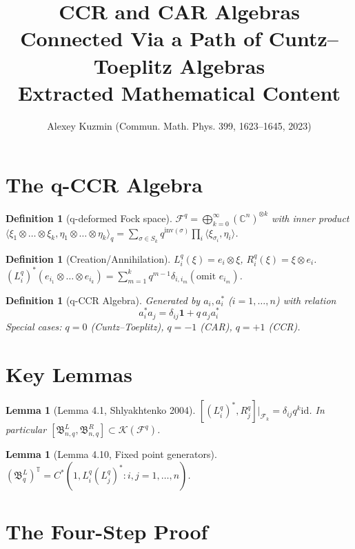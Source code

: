 \documentclass{article}
\title{CCR and CAR Algebras Connected Via a Path of Cuntz--Toeplitz Algebras\\
       \large Extracted Mathematical Content}
\author{Alexey Kuzmin (Commun. Math. Phys. 399, 1623--1645, 2023)}
\newtheorem{lemma}[theorem]{Lemma}
\newtheorem{definition}[theorem]{Definition}
\begin{document}
\maketitle

\section{The q-CCR Algebra}

\begin{definition}[q-deformed Fock space]
$\mathcal{F}^q = \bigoplus_{k=0}^\infty (\mathbb{C}^n)^{\otimes k}$ with inner product
$\langle \xi_1 \otimes \ldots \otimes \xi_k, \eta_1 \otimes \ldots \otimes \eta_k \rangle_q
= \sum_{\sigma \in S_k} q^{\mathrm{inv}(\sigma)} \prod_i \langle \xi_{\sigma_i}, \eta_i \rangle$.
\end{definition}

\begin{definition}[Creation/Annihilation]
$L_i^q(\xi) = e_i \otimes \xi$, $R_i^q(\xi) = \xi \otimes e_i$.
$(L_i^q)^*(e_{i_1} \otimes \ldots \otimes e_{i_k})
= \sum_{m=1}^k q^{m-1} \delta_{i,i_m} (\text{omit } e_{i_m})$.
\end{definition}

\begin{definition}[q-CCR Algebra]
Generated by $a_i, a_i^*$ ($i=1,\ldots,n$) with relation
\begin{equation}
a_i^* a_j = \delta_{ij} \mathbf{1} + q \, a_j a_i^*
\end{equation}
Special cases: $q=0$ (Cuntz--Toeplitz), $q=-1$ (CAR), $q=+1$ (CCR).
\end{definition}

\section{Key Lemmas}

\begin{lemma}[Lemma 4.1, Shlyakhtenko 2004]
$[(L_i^q)^*, R_j^q]|_{\mathcal{F}_k} = \delta_{ij} q^k \mathrm{id}$.
In particular $[\mathfrak{B}_{n,q}^L, \mathfrak{B}_{n,q}^R] \subset \mathcal{K}(\mathcal{F}^q)$.
\end{lemma}

\begin{lemma}[Lemma 4.10, Fixed point generators]
$(\mathfrak{B}_q^L)^{\mathbb{T}} = C^*(1, L_i^q (L_j^q)^* : i,j=1,\ldots,n)$.
\end{lemma}

\section{The Four-Step Proof}
\end{document}
